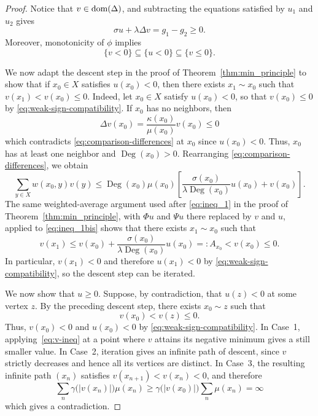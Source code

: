 \documentclass[letterpaper]{article}
\theoremstyle{definition}
\theoremstyle{named}
\numberwithin{equation}{section}
\newcommand{\dom}{\textnormal{dom}} %
\newcommand{\Deg}{\operatorname{Deg}}
\begin{document}
\begin{proof}
{
Notice that   $v\in\dom(\Delta)$, and subtracting the  equations satisfied by $u_1$ and $u_2$ gives
\begin{equation}
\label{eq:comparison-differences}
 \sigma u+\lambda\Delta v=g_1-g_2\geq0. 
\end{equation}
Moreover, monotonicity of $\phi$ implies
\begin{equation}
\label{eq:weak-sign-compatibility}
 \{v<0\}\subseteq\{u<0\}\subseteq\{v\leq0\}. 
\end{equation}

We now adapt the descent step in the proof of Theorem~\ref{thm:min_principle}
to show
that if $x_0\in X$ satisfies $u(x_0)<0$, then there exists
$x_1\sim x_0$ such that $v(x_1)<v(x_0) \leq 0$.
Indeed, let $x_0\in X$ satisfy
$u(x_0)<0$, so that $v(x_0)\leq0$ by \eqref{eq:weak-sign-compatibility}. If $x_0$ has no neighbors, then
\[
 \Delta v(x_0)=\frac{\kappa(x_0)}{\mu(x_0)}v(x_0)\leq0
\]
which contradicts \eqref{eq:comparison-differences} at $x_0$ since $u(x_0)<0$.
Thus, $x_0$ has at least one neighbor and $\Deg(x_0)>0$. Rearranging
\eqref{eq:comparison-differences}, we obtain
\begin{equation}
\label{eq:ineq_1bis}
 \sum_{y\in X}w(x_0,y)v(y)
 \leq
 \Deg(x_0) \mu(x_0)\left[ \frac{\sigma(x_0)}{\lambda\Deg(x_0)}u(x_0)
 +v(x_0)\right]. 
\end{equation}
The same weighted-average argument used after \eqref{eq:ineq_1} in the
proof of Theorem~\ref{thm:min_principle}, with $\Phi u$ and $\Psi u$
there replaced by $v$ and $u$, applied to \eqref{eq:ineq_1bis} shows that
there exists $x_1\sim x_0$ such that
\begin{equation}
\label{eq:v-ineq}
 v(x_1)
 \leq v(x_0)+\frac{\sigma(x_0)}{\lambda\Deg(x_0)}u(x_0)=:A_{x_0}
 <v(x_0)\leq0. 
\end{equation}
In particular, $v(x_1)<0$ and therefore $u(x_1)<0$ by
\eqref{eq:weak-sign-compatibility}, so the descent step can be
iterated.

We now show that $u \geq 0$. Suppose, by contradiction, that $u(z)<0$ at some vertex $z$. By the preceding
descent step, there exists $x_0\sim z$ such that
\[
v(x_0)<v(z)\leq0.
\]
Thus, $v(x_0)<0$ and $u(x_0)<0$ by
\eqref{eq:weak-sign-compatibility}. In
Case~1, applying~\eqref{eq:v-ineq} at a point where
$v$ attains its negative minimum gives a still smaller value. In
Case~2, iteration gives an infinite path of descent, since $v$ strictly decreases
and hence all its vertices are distinct. In Case~3, the resulting
infinite path $(x_n)$ satisfies $v(x_{n+1})<v(x_n)<0$, and therefore
\[
 \sum_n\gamma\bigl(|v(x_n)|\bigr)\mu(x_n)
 \geq
 \gamma\bigl(|v(x_0)|\bigr)\sum_n\mu(x_n)=\infty
\]
which gives a contradiction.

}
\end{proof}
\end{document}
